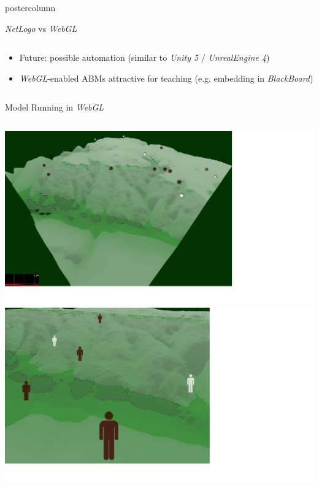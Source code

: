 \documentclass[final,hyperref={pdfpagelabels=false}]{beamer}
\begin{document}
\begin{frame}
\begin{columns}
\begin{column}{.33\textwidth}
\begin{beamercolorbox}[center,wd=\textwidth]{postercolumn}
\begin{minipage}[T]{.95\textwidth}
{\begin{block}{\textit{NetLogo} vs \textit{WebGL}}
\begin{columns}
\begin{column}{.99\textwidth}
\begin{itemize}
\begin{itemize}
                        \item Future: possible automation (similar to \textit{Unity 5} / \textit{UnrealEngine 4})
                        \item \textit{WebGL}-enabled ABMs attractive for teaching (e.g. embedding in \textit{BlackBoard})
                      \end{itemize}
                  \end{itemize}
                \end{column}
              \end{columns}
            \end{block}
            \vfill
            \begin{block}{Model Running in \textit{WebGL}}
              \begin{columns}
                \begin{column}{.99\textwidth}
                  \includegraphics[width=0.88\linewidth]{images/fp2}
                  \-
                  \includegraphics[width=0.88\linewidth]{images/fp3}
                \end{column}
              \end{columns}
            \end{block}
}
\end{minipage}
\end{beamercolorbox}
\end{column}
\end{columns}
\end{frame}
\end{document}
